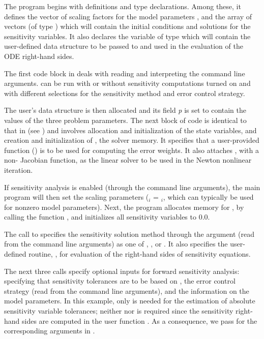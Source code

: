 The  program begins with definitions and type declarations. 
Among these, it defines the vector  of  scaling factors for
the model parameters , and the array  of vectors (of type )
which will contain the initial conditions and solutions for the sensitivity
variables. It also declares the variable  of type  
which will contain the user-defined data structure to be passed to
{\cvodes} and used in the evaluation of the ODE right-hand sides.

The first code block in  deals with reading and interpreting
the command line arguments.  can be run with
or without sensitivity computations turned on and with different
selections for the sensitivity method and error control strategy.

The user's data structure is then allocated and its field {\em p} is set to contain
the values of the three problem parameters.
The next block of code is identical to that in  (see \cite{cvode_ex})
and involves allocation and initialization of the state variables, and creation and 
initialization of , the {\cvodes} solver memory. It specifies that
a user-provided function () is to be used for computing the error weights.
It also attaches {\sunlinsoldense}, with a non- Jacobian
function, as the linear solver to be used in the Newton nonlinear iteration.

If sensitivity analysis is enabled (through the command line arguments), 
the main program will then set the scaling parameters
 ($_i$ = $_i$, which can typically be used for 
nonzero model parameters). 
Next, the program allocates memory for , by calling the {\nvecs} function 
, and initializes all sensitivity variables to $0.0$.

The call to  specifies the sensitivity solution
method through the argument  (read from the command
line arguments) as one of , ,
or .  It also specifies the user-defined routine, ,
for evaluation of the right-hand sides of sensitivity equations.

The next three calls specify optional inputs for forward sensitivity analysis:
specifying that sensitivity tolerances are to be based on ,
the error control strategy (read from the command line arguments), and
the information on the model parameters.
In this example, only  is needed for the estimation of absolute sensitivity
variable tolerances; neither  nor  is required since the
sensitivity right-hand sides are computed in the user function .  As a consequence,
we pass  for the corresponding arguments in .

